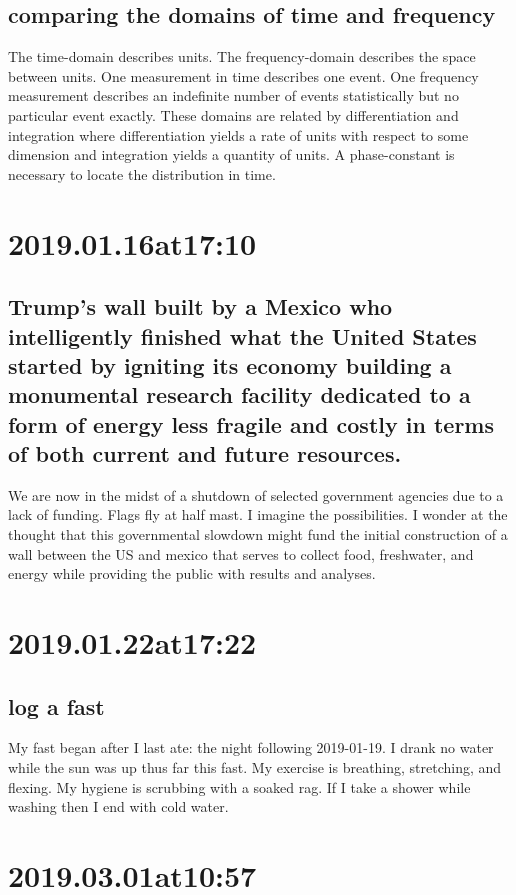 \subsection*{ comparing the domains of time and frequency }
The time-domain describes units. The frequency-domain describes the space between units. One measurement in time describes one event. One frequency measurement describes an indefinite number of events statistically but no particular event exactly. These domains are related by differentiation and integration where differentiation yields a rate of units with respect to some dimension and integration yields a quantity of units. A phase-constant is necessary to locate the distribution in time.

\section*{ 2019.01.16at17:10 }
\subsection*{ Trump's wall built by a Mexico who intelligently finished what the United States started by igniting its economy building a monumental research facility dedicated to a form of energy less fragile and costly in terms of both current and future resources. }
We are now in the midst of a shutdown of selected government agencies due to a lack of funding. Flags fly at half mast. I imagine the possibilities. I wonder at the thought that this governmental slowdown might fund the initial construction of a wall between the US and mexico that serves to collect food, freshwater, and energy while providing the public with results and analyses.

\section*{ 2019.01.22at17:22 }
\subsection*{ log a fast }
My fast began after I last ate: the night following 2019-01-19.
I drank no water while the sun was up thus far this fast.
My exercise is breathing, stretching, and flexing.
My hygiene is scrubbing with a soaked rag.
If I take a shower while washing then I end with cold water.

\section*{ 2019.03.01at10:57 }
